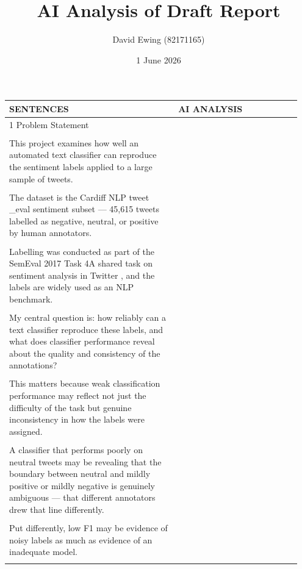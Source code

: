 \documentclass[11pt]{article}
\title{AI Analysis of Draft Report}
\author{David Ewing (82171165)}
\date{1 June 2026}
\begin{document}
\maketitle
\thispagestyle{empty}
\newpage

\setlength{\LTleft}{0pt}
\setlength{\LTright}{0pt}
\begin{longtable}{|p{0.55\linewidth}|p{0.40\linewidth}|}
\hline
\centering\textbf{SENTENCES} & \centering\textbf{AI ANALYSIS} \tabularnewline[2pt]
\hline
\endhead
1 Problem Statement & \\[2pt]
\hline
\rule{0pt}{3.5cm} & \\
\hline
This project examines how well an automated text classifier can reproduce the sentiment labels applied to a large sample of tweets. & \\[2pt]
\hline
\rule{0pt}{3.5cm} & \\
\hline
The dataset is the Cardiff NLP tweet \_eval sentiment subset --- 45,615 tweets labelled as negative, neutral, or positive by human annotators. & \\[2pt]
\hline
\rule{0pt}{3.5cm} & \\
\hline
Labelling was conducted as part of the SemEval 2017 Task 4A shared task on sentiment analysis in Twitter , and the labels are widely used as an NLP benchmark. & \\[2pt]
\hline
\rule{0pt}{3.5cm} & \\
\hline
My central question is: how reliably can a text classifier reproduce these labels, and what does classifier performance reveal about the quality and consistency of the annotations? & \\[2pt]
\hline
\rule{0pt}{3.5cm} & \\
\hline
This matters because weak classification performance may reflect not just the difficulty of the task but genuine inconsistency in how the labels were assigned. & \\[2pt]
\hline
\rule{0pt}{3.5cm} & \\
\hline
A classifier that performs poorly on neutral tweets may be revealing that the boundary between neutral and mildly positive or mildly negative is genuinely ambiguous --- that different annotators drew that line differently. & \\[2pt]
\hline
\rule{0pt}{3.5cm} & \\
\hline
Put differently, low F1 may be evidence of noisy labels as much as evidence of an inadequate model. & \\[2pt]
\hline
\rule{0pt}{3.5cm} & \\

\end{longtable}
\end{document}
